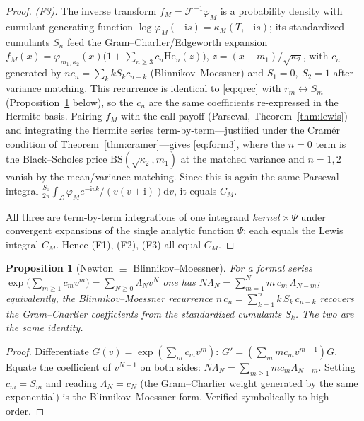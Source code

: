 \documentclass[11pt]{article}
\newcommand{\Ii}{\mathrm{i}}
\newcommand{\dd}{\mathrm{d}}
\newcommand{\Herm}{\mathrm{He}}
\theoremstyle{plain}
\newtheorem{proposition}[theorem]{Proposition}
\theoremstyle{definition}
\theoremstyle{remark}
\begin{document}
\begin{proof}
\emph{(F3).} The inverse transform $f_M=\mathcal F^{-1}\varphi_M$ is a probability
density with cumulant generating function $\log\varphi_M(-\Ii s)=\kappa_M(T,-\Ii s)$;
its standardized cumulants $S_n$ feed the Gram--Charlier/Edgeworth expansion
$f_M(x)=\varphi_{m_1,\kappa_2}(x)\bigl(1+\sum_{n\ge3}c_n\Herm_n(z)\bigr)$,
$z=(x-m_1)/\sqrt{\kappa_2}$, with $c_n$ generated by $n c_n=\sum_k kS_kc_{n-k}$
(Blinnikov--Moessner) and $S_1=0,\ S_2=1$ after variance matching. This recurrence
is identical to \eqref{eq:qrec} with
$r_m\leftrightarrow S_m$ (Proposition~\ref{prop:newton-bm} below), so the $c_n$ are
the same coefficients re-expressed in the Hermite basis. Pairing $f_M$ with the
call payoff (Parseval, Theorem~\ref{thm:lewis}) and integrating the Hermite series
term-by-term---justified under the Cramér condition of
Theorem~\ref{thm:cramer}---gives \eqref{eq:form3}, where the $n=0$ term is the
Black--Scholes price $\mathrm{BS}(\sqrt{\kappa_2},m_1)$ at the matched variance and
$n=1,2$ vanish by the mean/variance matching. Since this is again the same Parseval
integral $\frac{S_0}{2\pi}\int_{\mathcal L}\varphi_Me^{-\Ii vk}/(v(v+\Ii))\dd v$,
it equals $C_M$.

All three are term-by-term integrations of one integrand $kernel\times\Psi$ under
convergent expansions of the single analytic function $\Psi$; each equals the
Lewis integral $C_M$. Hence \textup{(F1)}, \textup{(F2)}, \textup{(F3)} all equal $C_M$.
\end{proof}

\begin{proposition}[Newton $\equiv$ Blinnikov--Moessner]\label{prop:newton-bm}
For a formal series $\exp\bigl(\sum_{m\ge1}c_m v^m\bigr)=\sum_{N\ge0}\Lambda_N v^N$
one has $N\Lambda_N=\sum_{m=1}^N m\,c_m\,\Lambda_{N-m}$; equivalently, the
Blinnikov--Moessner recurrence $n\,c_n=\sum_{k=1}^{n}k\,S_k\,c_{n-k}$ recovers the
Gram--Charlier coefficients from the standardized cumulants $S_k$. The two are the
same identity.
\end{proposition}
\begin{proof}
Differentiate $G(v)=\exp(\sum_m c_mv^m)$: $G'=(\sum_m mc_mv^{m-1})G$. Equate the
coefficient of $v^{N-1}$ on both sides: $N\Lambda_N=\sum_{m\ge1}mc_m\Lambda_{N-m}$.
Setting $c_m=S_m$ and reading $\Lambda_N=c_N$ (the Gram--Charlier weight generated
by the same exponential) is the Blinnikov--Moessner form. Verified symbolically to
high order.
\end{proof}
\end{document}
